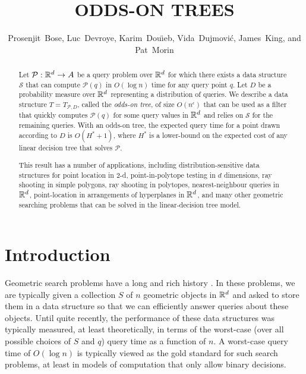 \documentclass{patmorin}
\title{\MakeUppercase{Odds-On Trees}}
\author{Prosenjit~Bose, 
        Luc~Devroye,
	Karim~Dou\"{\i}eb, 
	Vida~Dujmovi\'c, 
	James~King, and 
	Pat~Morin}
\newcommand{\eps}{\epsilon}
\begin{document}
\maketitle

\begin{abstract}
  Let $\mathcal{P}:\mathbb{R}^d\rightarrow A$ be a query problem over $\mathbb{R}^d$
  for which there exists a data structure $\mathcal{S}$ that can compute
  $\mathcal{P}(q)$ in $O(\log n)$ time for any query point $q$.  Let $D$
  be a probability measure over $\mathbb{R}^d$ representing a distribution of
  queries.  We describe a data structure $T=T_{\mathcal{P},D}$, called
  the \emph{odds-on tree}, of size $O(n^\eps)$ that can be used as a
  filter that quickly computes $\mathcal{P}(q)$ for some query values in
  $\mathbb{R}^d$ and relies on $\mathcal{S}$ for the remaining queries.  With an
  odds-on tree, the expected query time for a point drawn according to
  $D$ is $O(H^*+1)$, where $H^*$ is a lower-bound on the expected cost
  of any linear decision tree that solves $\mathcal{P}$.

  This result has a number of applications, including
  distribution-sensitive data structures for point location in 2-d,
  point-in-polytope testing in $d$ dimensions, ray shooting in simple
  polygons, ray shooting in polytopes, nearest-neighbour queries in
  $\mathbb{R}^d$, point-location in arrangements of hyperplanes in $\mathbb{R}^d$,
  and many other geometric searching problems that can be solved in the
  linear-decision tree model.
\end{abstract}

\section{Introduction}

Geometric search problems have a long and rich history
\cite{ae99,g00chapter,ms05}. In these problems, we are typically
given a collection $S$ of $n$ geometric objects in $\mathbb{R}^d$ and asked
to store them in a data structure so that we can efficiently answer
queries about these objects. Until quite recently, the performance of
these data structures was typically measured, at least theoretically,
in terms of the worst-case (over all possible choices of $S$ and $q$)
query time as a function of $n$.  A worst-case query time of $O(\log
n)$ is typically viewed as the gold standard for such search problems,
at least in models of computation that only allow binary decisions.
\end{document}
